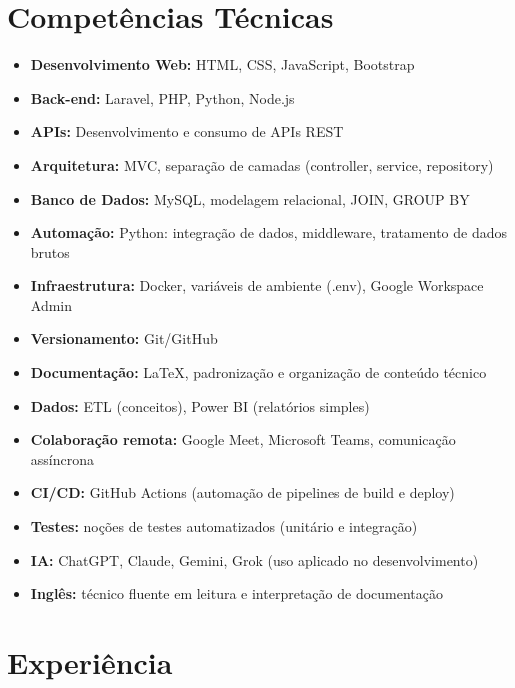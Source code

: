 \documentclass[11pt,a4paper]{article}
\begin{document}
\section{Competências Técnicas}
\begin{itemize}
  \item \textbf{Desenvolvimento Web:} HTML, CSS, JavaScript, Bootstrap
  \item \textbf{Back-end:} Laravel, PHP, Python, Node.js
  \item \textbf{APIs:} Desenvolvimento e consumo de APIs REST
  \item \textbf{Arquitetura:} MVC, separação de camadas (controller, service, repository)
  \item \textbf{Banco de Dados:} MySQL, modelagem relacional, JOIN, GROUP BY
  \item \textbf{Automação:} Python: integração de dados, middleware, tratamento de dados brutos
  \item \textbf{Infraestrutura:} Docker, variáveis de ambiente (.env), Google Workspace Admin
  \item \textbf{Versionamento:} Git/GitHub
  \item \textbf{Documentação:} \LaTeX, padronização e organização de conteúdo técnico
  \item \textbf{Dados:} ETL (conceitos), Power BI (relatórios simples)
  \item \textbf{Colaboração remota:} Google Meet, Microsoft Teams, comunicação assíncrona
  \item \textbf{CI/CD:} GitHub Actions (automação de pipelines de build e deploy)
  \item \textbf{Testes:} noções de testes automatizados (unitário e integração)
  \item \textbf{IA:} ChatGPT, Claude, Gemini, Grok (uso aplicado no desenvolvimento)
  \item \textbf{Inglês:} técnico fluente em leitura e interpretação de documentação
\end{itemize}

\section{Experiência}
\end{document}
